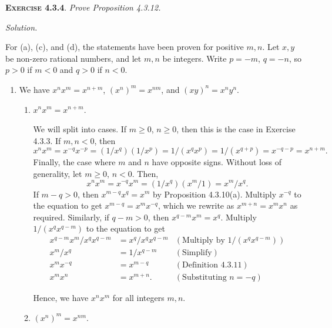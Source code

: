 \documentclass[12pt]{article}
\theoremstyle{remark}
\newenvironment{exer}[2]{
    \noindent \setlength{\parskip}{1em}%
    \textsc{\textbf{Exercise #1}}. \textit{#2} \par
    \noindent \textit{Solution.} %
}{\bigskip}
\begin{document}
\begin{exer}{4.3.4}{
    Prove Proposition 4.3.12.
}
    For (a), (c), and (d), the statements have been proven for positive $m, n$.
    Let $x, y$ be non-zero rational numbers, and let $m, n$ be integers.
    Write $p = -m$, $q = -n$, so $p > 0$ if $m < 0$ and $q > 0$ if $n < 0$.
    
    \begin{enumerate}[topsep=0mm,label=(\alph*)]
        \item We have $x^n x^m = x^{n+m}$, $(x^n)^m = x^{nm}$, and $(xy)^n = x^n y^n$.

        \begin{enumerate}[topsep=0mm,label=(\roman*)]
            \item $x^n x^m = x^{n+m}$.

                We will split into cases.
                If $m \ge 0$, $n \ge 0$, then this is the case in Exercise 4.3.3.
                If $m, n < 0$, then
                \[
                    x^n x^m = x^{-q} x^{-p} = (1/x^q)(1/x^p) = 1/(x^q x^p) = 1/(x^{q+p}) = x^{-q-p} = x^{n+m}.
                \]
                Finally, the case where $m$ and $n$ have opposite signs.
                Without loss of generality, let $m \ge 0$, $n < 0$.
                Then,
                \[
                    x^n x^m = x^{-q} x^m = (1 / x^q)(x^m / 1) = x^m / x^q.
                \]
                If $m - q > 0$, then $x^{m-q} x^q = x^m$ by Proposition 4.3.10(a).
                Multiply $x^{-q}$ to the equation to get $x^{m-q} = x^m x^{-q}$, which we rewrite as $x^{m+n} = x^m x^n$ as required.
                Similarly, if $q - m > 0$, then $x^{q-m} x^m = x^q$.
                Multiply $1/(x^q x^{q-m})$ to the equation to get
                \begin{align*}
                    x^{q - m} x^m / x^q x^{q - m} &= x^q / x^q x^{q - m} & (\text{Multiply by } 1/(x^q x^{q-m})) \\
                    x^m / x^q &= 1 / x^{q - m} & (\text{Simplify})\\
                    x^m x^{-q} &= x^{m - q} & (\text{Definition 4.3.11})\\
                    x^m x^n &= x^{m + n}. & (\text{Substituting } n = -q)
                \end{align*}

                Hence, we have $x^n x^m$ for all integers $m, n$.
            
            \item $(x^n)^m = x^{nm}$.


\end{enumerate}
\end{enumerate}
\end{exer}
\end{document}
